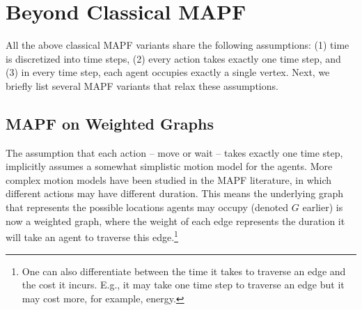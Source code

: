 \documentclass[letterpaper]{article} %
\begin{document}
\section{Beyond Classical MAPF}
All the above classical MAPF variants share the following assumptions: (1) time is discretized into time steps, (2) every action takes exactly one time step,
and (3) in every time step, each agent occupies exactly a single vertex.
Next, we briefly list several MAPF variants that relax these assumptions.
\subsection{MAPF on Weighted Graphs}
The assumption that each action -- move or wait -- takes exactly one time step, implicitly assumes a somewhat simplistic motion model for the agents.
More complex motion models have been studied in the MAPF literature, in which different actions may have different duration. %
This means the underlying graph that represents the possible locations agents may occupy (denoted $G$ earlier) is now a weighted graph, where the weight of each edge represents the duration it will take an agent to traverse this edge.\footnote{One can also differentiate between the time it takes to traverse an edge and the cost it incurs. E.g., it may take one time step to traverse an edge but it may cost more, for example, energy.}
\end{document}
